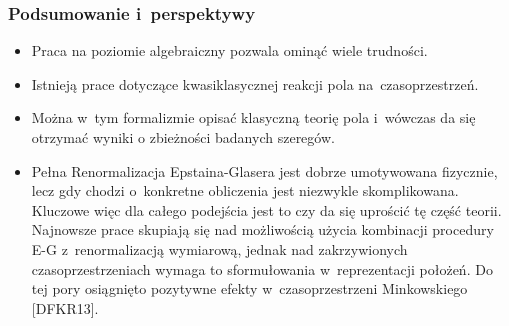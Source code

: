 \documentclass[10pt,t]{beamer}
\begin{document}
\begin{frame}
  \frametitle{Podsumowanie i~perspektywy}


  \begin{itemize}
    \RaggedRight

  \item Praca na poziomie algebraiczny pozwala ominąć wiele trudności.

  \item Istnieją prace dotyczące kwasiklasycznej reakcji pola
    na~czasoprzestrzeń.

  \item Można w~tym formalizmie opisać klasyczną teorię pola
    i~wówczas da się otrzymać wyniki o zbieżności badanych szeregów.

  \item Pełna Renormalizacja Epstaina-Glasera jest dobrze umotywowana
    fizycznie, lecz gdy chodzi o~konkretne obliczenia jest niezwykle
    skomplikowana. Kluczowe więc dla całego podejścia jest to czy da się
    uprościć tę część teorii. Najnowsze prace skupiają się nad możliwością
    użycia kombinacji procedury E-G z~renormalizacją wymiarową,
    jednak nad zakrzywionych czasoprzestrzeniach wymaga to
    sformułowania w~reprezentacji położeń. Do tej pory osiągnięto
    pozytywne efekty w~czasoprzestrzeni Minkowskiego [DFKR13].

  \end{itemize}

\end{frame}










\appendix





\end{document}
